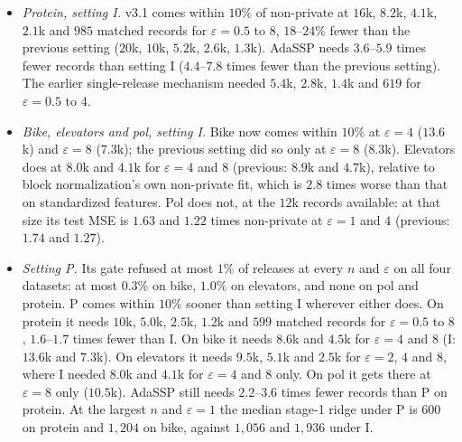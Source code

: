 \documentclass[11pt]{article}
\theoremstyle{definition}
\theoremstyle{plain}
\begin{document}
\begin{itemize}
  \item \emph{Protein, setting I.} v3.1 comes within $10\%$ of non-private at $16$k, $8.2$k, $4.1$k, $2.1$k and $985$ matched records for $\varepsilon = 0.5$ to $8$, $18$--$24\%$ fewer than the previous setting ($20$k, $10$k, $5.2$k, $2.6$k, $1.3$k). AdaSSP needs $3.6$--$5.9$ times fewer records than setting I ($4.4$--$7.8$ times fewer than the previous setting). The earlier single-release mechanism needed $5.4$k, $2.8$k, $1.4$k and $619$ for $\varepsilon = 0.5$ to $4$.
  \item \emph{Bike, elevators and pol, setting I.} Bike now comes within $10\%$ at $\varepsilon = 4$ ($13.6$k) and $\varepsilon = 8$ ($7.3$k); the previous setting did so only at $\varepsilon = 8$ ($8.3$k). Elevators does at $8.0$k and $4.1$k for $\varepsilon = 4$ and $8$ (previous: $8.9$k and $4.7$k), relative to block normalization's own non-private fit, which is $2.8$ times worse than that on standardized features. Pol does not, at the $12$k records available: at that size its test MSE is $1.63$ and $1.22$ times non-private at $\varepsilon = 1$ and $4$ (previous: $1.74$ and $1.27$).
  \item \emph{Setting P.} Its gate refused at most $1\%$ of releases at every $n$ and $\varepsilon$ on all four datasets: at most $0.3\%$ on bike, $1.0\%$ on elevators, and none on pol and protein. P comes within $10\%$ sooner than setting I wherever either does. On protein it needs $10$k, $5.0$k, $2.5$k, $1.2$k and $599$ matched records for $\varepsilon = 0.5$ to $8$, $1.6$--$1.7$ times fewer than I. On bike it needs $8.6$k and $4.5$k for $\varepsilon = 4$ and $8$ (I: $13.6$k and $7.3$k). On elevators it needs $9.5$k, $5.1$k and $2.5$k for $\varepsilon = 2$, $4$ and $8$, where I needed $8.0$k and $4.1$k for $\varepsilon = 4$ and $8$ only. On pol it gets there at $\varepsilon = 8$ only ($10.5$k). AdaSSP still needs $2.2$--$3.6$ times fewer records than P on protein. At the largest $n$ and $\varepsilon = 1$ the median stage-1 ridge under P is $600$ on protein and $1{,}204$ on bike, against $1{,}056$ and $1{,}936$ under I.

\end{itemize}
\end{document}
